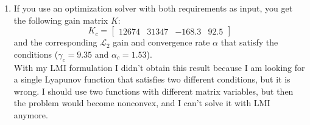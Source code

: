 \documentclass[11pt,a4paper]{article}
\begin{document}
\begin{enumerate}
	\item If you use an optimization solver with both requirements as input, you get the following gain matrix $K$:
	\begin{equation}
		K_c= \begin{bmatrix} 12674 & 31347 & -168.3 & 92.5 \end{bmatrix}
	\end{equation}
	and the corresponding $\mathcal{L}_2$ gain and convergence rate $\alpha$ that satisfy the conditions ($\gamma_c=9.35$ and $\alpha_c=1.53$).\\ With my LMI formulation I didn't obtain this result because I am looking for a single Lyapunov function that satisfies two different conditions, but it is wrong. I should use two functions with different matrix variables, but then the problem would become nonconvex, and I can't solve it with LMI anymore.
	
\end{enumerate}
\newpage
\hypersetup{linkcolor = black}
\listoffigures
\end{document}
